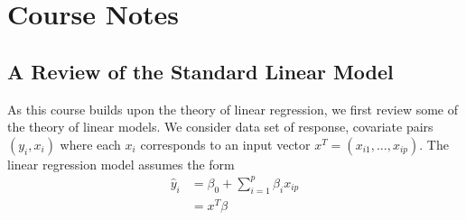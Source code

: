 \chapter{Course Notes}

\newpage
{}

\section{A Review of the Standard Linear Model}

As this course builds upon the theory of linear regression, we first review some of the theory of linear models. We consider data set of response, covariate pairs $(y_i, x_i)$ where each $x_i$ corresponds to an input vector $x^T = (x_{i1}, \dots, x_{ip})$. The linear regression model assumes the form 
\begin{align*}
  \hat{y}_i &= \beta_0 + \sum_{i=1}^{p}\beta_i x_{ip}   \\
            &= x^T\beta
\end{align*}
$$$$